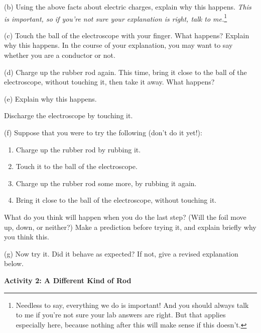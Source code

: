 \answerspace{1in}

(b) Using the above facts about electric charges, explain why this happens.  \textit{This is important, so if you're not sure your explanation is
right, talk to me.}\footnote{Needless to say, everything we do
is important! And you should always talk to me if you're not sure your
lab answers are right. But that applies especially here, because nothing
after this will make sense if this doesn't.}

\answerspace{1in}

\pagebreak[3]
(c) Touch the ball of the electroscope with your finger. What happens? Explain why this
happens.  In the course of your explanation, you may want to say
whether you are a conductor or not.

\answerspace{1.3in}

(d) Charge up the rubber rod again. This time, bring it close to the
ball of the electroscope, without touching it, then take it away.
What happens?

\answerspace{0.8in}

(e) Explain why this happens.

\answerspace{1in}

Discharge the electroscope by touching it.

(f) Suppose that you were to try the following (don't do it yet!):

\vspace{-\parskip}
\begin{enumerate}[nosep]
\item Charge up the rubber rod by rubbing it.
\item Touch it to the ball of the electroscope.
\item Charge up the rubber rod some more, by rubbing it again.
\item Bring it close to the ball of the electroscope, without
touching it.
\end{enumerate}

What do you think will happen when you do the last step? (Will the
foil move up, down, or neither?) Make a prediction before trying it,
and explain briefly why you think this.

\answerspace{1.7in}

(g) Now try it. Did it behave as expected?  If not, give a revised explanation below.

\answerspace{1in}

\pagebreak[2]
\textbf{Activity 2: A Different Kind of Rod}

